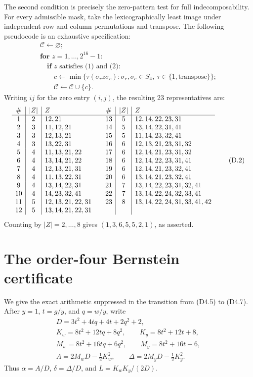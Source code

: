 \documentclass[10pt,a4paper]{amsart}
\theoremstyle{definition}
\theoremstyle{remark}
\newenvironment{exacttable}
  {\begingroup\small
   \setlength{\arraycolsep}{4pt}%
   \renewcommand{\arraystretch}{1.12}}
  {\endgroup}
\begin{document}
The second condition is precisely the zero-pattern test for full
indecomposability.  For every admissible mask, take the lexicographically
least image under independent row and column permutations and transpose.
The following pseudocode is an exhaustive specification:
\[
\begin{array}{l}
\mathcal C\leftarrow\varnothing;\\
\textbf{for }z=1,\ldots,2^{16}-1:\\
\quad\textbf{if }z\text{ satisfies (1) and (2):}\\
\qquad c\leftarrow\min\{\tau(\sigma_r z\sigma_c):
 \sigma_r,\sigma_c\in S_4,\ \tau\in\{1,\text{transpose}\}\};\\
\qquad\mathcal C\leftarrow\mathcal C\cup\{c\}.
\end{array}
\tag{D.1}
\]
Writing \(ij\) for the zero entry \((i,j)\), the resulting \(23\)
representatives are:
\begin{exacttable}
\[
\begin{array}{c|c|l@{\qquad}c|c|l}
\#&|Z|&Z&\#&|Z|&Z\\ \hline
1&2&12,21&13&5&12,14,22,23,31\\
2&3&11,12,21&14&5&13,14,22,31,41\\
3&3&12,13,21&15&5&11,14,23,32,41\\
4&3&13,22,31&16&6&12,13,21,23,31,32\\
5&4&11,13,21,22&17&6&12,14,21,23,31,32\\
6&4&13,14,21,22&18&6&12,14,22,23,31,41\\
7&4&12,13,21,31&19&6&12,14,21,23,32,41\\
8&4&11,13,22,31&20&6&13,14,21,23,32,41\\
9&4&13,14,22,31&21&7&13,14,22,23,31,32,41\\
10&4&14,23,32,41&22&7&13,14,22,24,32,33,41\\
11&5&12,13,21,22,31&23&8&13,14,22,24,31,33,41,42\\
12&5&13,14,21,22,31&&&
\end{array}
\tag{D.2}
\]
\end{exacttable}
Counting by \(|Z|=2,\ldots,8\) gives
\((1,3,6,5,5,2,1)\), as asserted.

\section{The order-four Bernstein certificate}
\label{app:bernstein-certificate}

We give the exact arithmetic suppressed in the transition from (D4.5) to
(D4.7).  After \(y=1\), \(t=g/y\), and \(q=w/y\), write
\[
\begin{gathered}
D=3t^2+4tq+4t+2q^2+2,\\
K_w=8t^2+12tq+8q^2,\qquad K_y=8t^2+12t+8,\\
M_w=8t^2+16tq+6q^2,\qquad M_y=8t^2+16t+6,\\
A=2M_wD-\tfrac12K_w^2,\qquad
\Delta=2M_yD-\tfrac12K_y^2.
\end{gathered}
\]
Thus \(\alpha=A/D\), \(\delta=\Delta/D\), and
\(L=K_wK_y/(2D)\).
\end{document}
